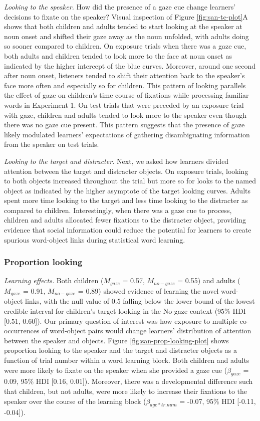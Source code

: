 \documentclass[man,floatsintext]{apa6}
\begin{document}
\emph{Looking to the speaker.} How did the presence of a gaze cue change
learners' decisions to fixate on the speaker? Visual inspection of
Figure \ref{fig:san-tc-plot}A shows that both children and adults tended
to start looking at the speaker at noun onset and shifted their gaze
away as the noun unfolded, with adults doing so sooner compared to
children. On exposure trials when there was a gaze cue, both adults and
children tended to look more to the face at noun onset as indicated by
the higher intercept of the blue curves. Moreover, around one second
after noun onset, listeners tended to shift their attention back to the
speaker's face more often and especially so for children. This pattern
of looking parallels the effect of gaze on children's time course of
fixations while processing familiar words in Experiment 1. On test
trials that were preceded by an exposure trial with gaze, children and
adults tended to look more to the speaker even though there was no gaze
cue present. This pattern suggests that the presence of gaze likely
modulated learners' expectations of gathering disambiguating information
from the speaker on test trials.

\emph{Looking to the target and distracter.} Next, we asked how learners
divided attention between the target and distracter objects. On exposure
trials, looking to both objects increased throughout the trial but more
so for looks to the named object as indicated by the higher asymptote of
the target looking curves. Adults spent more time looking to the target
and less time looking to the distracter as compared to children.
Interestingly, when there was a gaze cue to process, children and adults
allocated fewer fixations to the distracter object, providing evidence
that social information could reduce the potential for learners to
create spurious word-object links during statistical word learning.

\subsubsection{Proportion looking}\label{proportion-looking}

\emph{Learning effects.} Both children (\(M_{gaze}\) = 0.57,
\(M_{no-gaze}\) = 0.55) and adults (\(M_{gaze}\) = 0.91, \(M_{no-gaze}\)
= 0.89) showed evidence of learning the novel word-object links, with
the null value of 0.5 falling below the lower bound of the lowest
credible interval for children's target looking in the No-gaze context
(95\% HDI {[}0.51, 0.60{]}). Our primary question of interest was how
exposure to multiple co-occurrences of word-object pairs would change
learners' distribution of attention between the speaker and objects.
Figure \ref{fig:san-prop-looking-plot} shows proportion looking to the
speaker and the target and distracter objects as a function of trial
number within a word learning block. Both children and adults were more
likely to fixate on the speaker when she provided a gaze cue
(\(\beta_{gaze}\) = 0.09, 95\% HDI {[}0.16, 0.01{]}). Moreover, there
was a developmental difference such that children, but not adults, were
more likely to increase their fixations to the speaker over the course
of the learning block (\(\beta_{age*tr.num}\) = -0.07, 95\% HDI
{[}-0.11, -0.04{]}).
\end{document}

